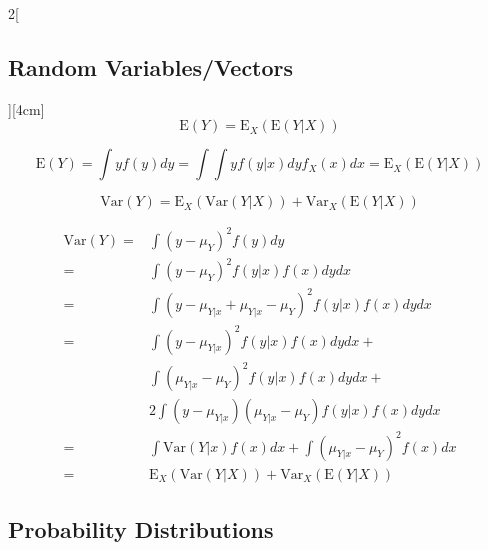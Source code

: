 \documentclass[8pt]{extarticle}
\begin{document}
\begin{multicols}{2}[\subsection{Random Variables/Vectors}][4cm]
$$\mathrm{E}(Y)=\mathrm{E}_X(\mathrm{E}(Y|X))$$
\begin{Proof}
$$\mathrm{E}(Y) = \int yf(y)dy = \int\int y f(y|x)dy f_X(x)dx = \mathrm{E}_X(\mathrm{E}(Y|X))$$
\end{Proof}
$$\mathrm{Var}(Y) = \mathrm{E}_X(\mathrm{Var}(Y|X)) + \mathrm{Var}_X(\mathrm{E}(Y|X))$$
\begin{Proof}
\begin{align*}
\mathrm{Var}(Y) =&  \int (y- \mu_Y)^2 f(y)dy\\
=& \int (y- \mu_Y)^2 f(y|x)f(x)dydx\\
=& \int (y- \mu_{Y|x} + \mu_{Y|x} - \mu_Y)^2 f(y|x)f(x)dydx\\
=& \int (y- \mu_{Y|x})^2 f(y|x)f(x)dydx + \\
 & \int (\mu_{Y|x} - \mu_Y)^2 f(y|x)f(x)dydx + \\
 & 2 \int (y- \mu_{Y|x})(\mu_{Y|x} - \mu_Y) f(y|x)f(x)dydx \\
=& \int \mathrm{Var}(Y|x)f(x)dx + \int (\mu_{Y|x} - \mu_Y)^2f(x)dx\\
=& \mathrm{E}_X(\mathrm{Var}(Y|X)) + \mathrm{Var}_X(\mathrm{E}(Y|X))
\end{align*}
\end{Proof}

\end{multicols}

\subsection{Probability Distributions}
\end{document}
